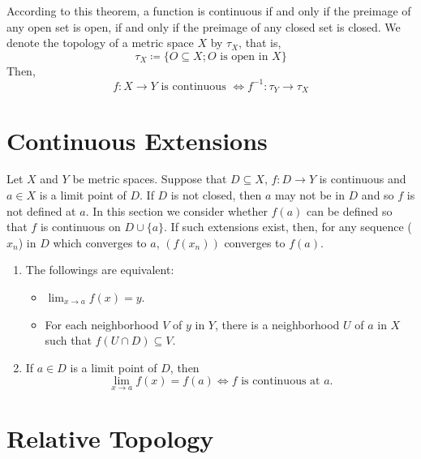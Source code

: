 \begin{remark}
    According to this theorem, a function is continuous if and only if the preimage of any 
    open set is open, if and only if the preimage of any closed set is closed. We denote 
    the topology of a metric space \(X\) by \(\tau_X\), that is, 
    \[
        \tau_X \coloneqq \{ O \subseteq X ; O \text{ is open in } X \}  
    \]
    Then, 
    \[
        f \colon X \to Y \text{ is continuous } \Longleftrightarrow f^{-1} \colon \tau_Y \to \tau_X  
    \]
\end{remark}

\section{Continuous Extensions}

Let \(X\) and \(Y\) be metric spaces. Suppose that \(D \subseteq X\), \(f \colon D \to Y\) is 
continuous and \(a \in X\) is a limit point of \(D\). If \(D\) is not closed, then \(a\) may 
not be in \(D\) and so \(f\) is not defined at \(a\). In this section we consider whether 
\(f\left(a\right)\) can be defined so that \(f\) is continuous on \(D \cup \{a\}\). If such 
extensions exist, then, for any sequence (\(x_n\)) in \(D\) which converges to \(a\), 
\(\left(f\left(x_n\right)\right)\) converges to \(f\left(a\right)\). 

\begin{remark}
    \begin{enumerate}[label=(\alph*)]
        \item The followings are equivalent:
        \begin{itemize}
            \item \(\lim_{x\to a}f\left(x\right) = y\). 
            \item For each neighborhood \(V\) of \(y\) in \(Y\), there is a neighborhood \(U\)
            of \(a\) in \(X\) such that \(f\left(U \cap D\right) \subseteq V\). 
        \end{itemize}
        \item If \(a \in D\) is a limit point of \(D\), then 
        \[
            \lim_{x\to a} f(x) = f(a) \Longleftrightarrow f \text{ is continuous at } a.  
        \]
    \end{enumerate}
\end{remark}

\section{Relative Topology}

